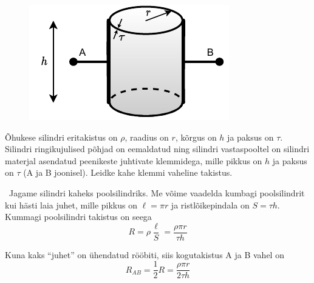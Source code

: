 
\begin{figure}
  \vspace{-2em}
  \begin{center}
    \includegraphics[width=\linewidth]{2022-v3g-03-yl.pdf}
  \end{center}
  \vspace{-2em}
\end{figure}

Õhukese silindri eritakistus on $\rho$, raadius on $r$, kõrgus on $h$ ja paksus on $\tau$. Silindri ringikujulised põhjad on eemaldatud ning silindri vastaspooltel on silindri materjal asendatud peenikeste juhtivate klemmidega, mille pikkus on $h$ ja paksus on $\tau$ (A ja B joonisel). Leidke kahe klemmi vaheline takistus.



\hint

\solu
\
Jagame silindri kaheks poolsilindriks. Me võime vaadelda kumbagi poolsilindrit kui hästi laia juhet, mille pikkus on $\ell = \pi r$ ja ristlõikepindala on $S = \tau h$. Kummagi poolsilindri takistus on seega
\begin{equation*}
    R = \rho \frac{\ell}{S} = \frac{\rho \pi r}{\tau h}
\end{equation*}

Kuna kaks ``juhet'' on ühendatud rööbiti, siis kogutakistus A ja B vahel on
\begin{equation*}
    R_{AB} = \frac{1}{2}R = \frac{\rho \pi r}{2\tau h}
\end{equation*}
\probend